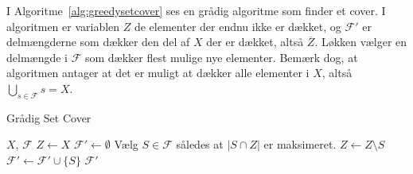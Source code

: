 I Algoritme~\ref{alg:greedysetcover} ses en grådig algoritme som finder et cover. I algoritmen er variablen $Z$ de elementer der endnu ikke er dækket, og $\mathcal{F}'$ er delmængderne som dækker den del af $X$ der er dækket, altså $\overline{Z}$. Løkken vælger en delmængde i $\mathcal{F}$ som dækker flest mulige nye elementer. Bemærk dog, at algoritmen antager at det er muligt at dækker alle elementer i $X$, altså $\bigcup_{s \in \mathcal{F}} s = X$.

\begin{algorithm}
	\caption{\label{alg:greedysetcover}Grådig Set Cover}
	\begin{algorithmic}
		\REQUIRE $X$, $\mathcal{F}$
		\STATE $Z \leftarrow X$
		\STATE $\mathcal{F}' \leftarrow \emptyset$
		\STATE Vælg $S \in \mathcal{F}$ således at $|S \cap Z|$ er maksimeret.
		\STATE $Z \leftarrow Z \setminus S$
		\STATE $\mathcal{F}' \leftarrow \mathcal{F}' \cup \{S\}$
		\ENDWHILE
		\RETURN $\mathcal{F}'$
	\end{algorithmic}
\end{algorithm}

